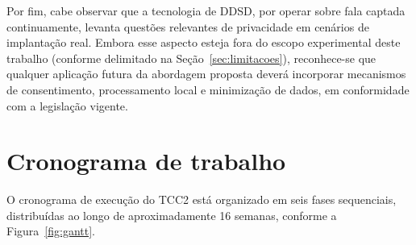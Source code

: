 \documentclass[
    12pt,                %
    openright,           %
    oneside,             %
    a4paper,             %
    english,             %
    brazil               %
]{abntex2}
\begin{document}
Por fim, cabe observar que a tecnologia de DDSD, por operar sobre fala captada continuamente, levanta questões relevantes de privacidade em cenários de implantação real. Embora esse aspecto esteja fora do escopo experimental deste trabalho (conforme delimitado na Seção~\ref{sec:limitacoes}), reconhece-se que qualquer aplicação futura da abordagem proposta deverá incorporar mecanismos de consentimento, processamento local e minimização de dados, em conformidade com a legislação vigente.

\section{Cronograma de trabalho}
\label{sec:cronograma}

O cronograma de execução do TCC2 está organizado em seis fases sequenciais, distribuídas ao longo de aproximadamente 16 semanas, conforme a Figura~\ref{fig:gantt}.
\end{document}
